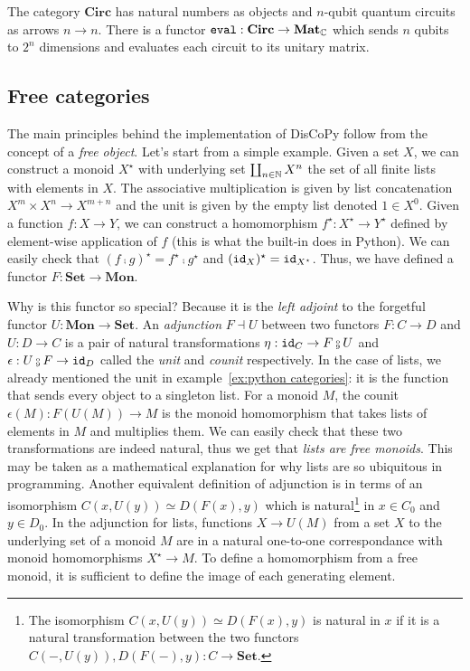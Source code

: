 \begin{example}
The category $\mathbf{Circ}$ has natural numbers as objects and $n$-qubit quantum circuits as arrows $n \to n$.
There is a functor $\mathtt{eval} : \mathbf{Circ} \to \mathbf{Mat}_{\mathbb{C}}$ which sends $n$ qubits to $2^n$ dimensions and evaluates each circuit to its unitary matrix.
\end{example}

\subsection{Free categories}\label{subsection:free-categories}

The main principles behind the implementation of DisCoPy follow from the concept of a \emph{free object}.
Let's start from a simple example.
Given a set $X$, we can construct a monoid $X^\star$ with underlying set $\coprod_{n \in \mathbb{N}} X^n$ the set of all finite lists with elements in $X$.
The associative multiplication is given by list concatenation $X^m \times X^n \to X^{m + n}$ and the unit is given by the empty list denoted $1 \in X^0$.
Given a function $f : X \to Y$, we can construct a homomorphism $f^\star : X^\star \to Y^\star$ defined by element-wise application of $f$ (this is what the built-in  does in Python).
We can easily check that $(f \fcmp g)^\star = f^\star \fcmp g^\star$ and $(\mathtt{id}_X)^\star = \mathtt{id}_{X^\star}$.
Thus, we have defined a functor $F : \mathbf{Set} \to \mathbf{Mon}$.

Why is this functor so special? Because it is the \emph{left adjoint} to the forgetful functor $U : \mathbf{Mon} \to \mathbf{Set}$.
An \emph{adjunction} $F \dashv U$ between two functors $F : C \to D$ and $U : D \to C$ is a pair of natural transformations $\eta : \id_C \to F \fcmp U$ and $\epsilon : U \fcmp F \to \id_D$ called the \emph{unit} and \emph{counit} respectively.
In the case of lists, we already mentioned the unit in example~\ref{ex:python categories}: it is the function that sends every object to a singleton list.
For a monoid $M$, the counit $\epsilon(M) : F(U(M)) \to M$ is the monoid homomorphism that takes lists of elements in $M$ and multiplies them.
We can easily check that these two transformations are indeed natural, thus we get that \emph{lists are free monoids}.
This may be taken as a mathematical explanation for why lists are so ubiquitous in programming.
Another equivalent definition of adjunction is in terms of an isomorphism $C(x, U(y)) \simeq D(F(x), y)$ which is natural\footnote
{The isomorphism $C(x, U(y)) \simeq D(F(x), y)$ is natural in $x$ if it is a natural transformation between the two functors $C(-, U(y)), D(F(-), y) : C \to \mathbf{Set}$.}
in $x \in C_0$ and $y \in D_0$.
In the adjunction for lists, functions $X \to U(M)$ from a set $X$ to the underlying set of a monoid $M$ are in a natural one-to-one correspondance with monoid homomorphisms $X^\star \to M$.
To define a homomorphism from a free monoid, it is sufficient to define the image of each generating element.

